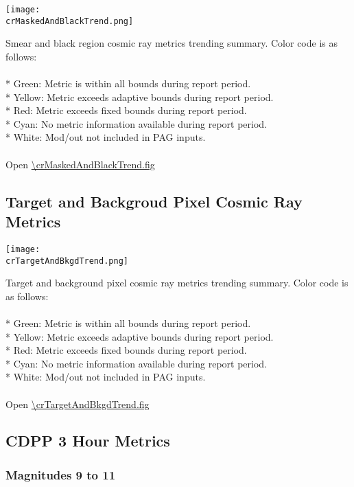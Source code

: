 \begin{center}
\texttt{[image: \\crMaskedAndBlackTrend.png]}
\end{center}
Smear and black region cosmic ray metrics trending summary. Color code is as follows:\\
\\
* Green: Metric is within all bounds during report period.\\
* Yellow: Metric exceeds adaptive bounds during report period.\\
* Red: Metric exceeds fixed bounds during report period.\\
* Cyan: No metric information available during report period.\\
* White: Mod/out not included in PAG inputs.\\
\\
Open \url{\crMaskedAndBlackTrend.fig}

\newpage

\subsection{Target and Backgroud Pixel Cosmic Ray Metrics}

\begin{center}
\texttt{[image: \\crTargetAndBkgdTrend.png]}
\end{center}
Target and background pixel cosmic ray metrics trending summary. Color code is as follows:\\
\\
* Green: Metric is within all bounds during report period.\\
* Yellow: Metric exceeds adaptive bounds during report period.\\
* Red: Metric exceeds fixed bounds during report period.\\
* Cyan: No metric information available during report period.\\
* White: Mod/out not included in PAG inputs.\\
\\
Open \url{\crTargetAndBkgdTrend.fig}

\newpage

\subsection{CDPP 3 Hour Metrics}

\subsubsection{Magnitudes 9 to 11}

